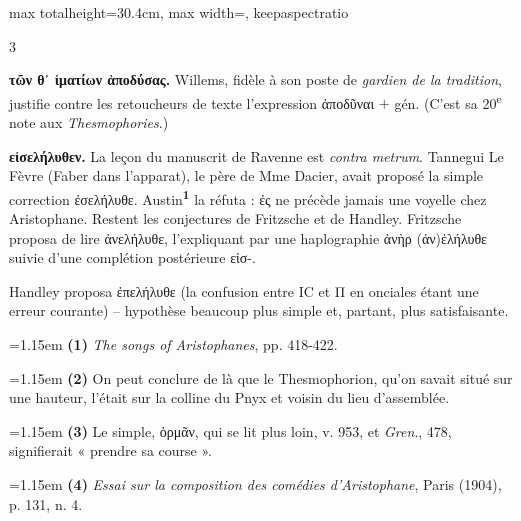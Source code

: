 \documentclass[11pt,twoside]{book}
\newcommand{\italique}[1]{\textit{#1}}
\newcommand{\nieme}[1]{#1\textsuperscript{e}}
\newcommand{\marqueur}[1]{\textsuperscript{\color{rubricRed}\textbf{#1}}}
\begin{document}
\begin{adjustbox}{max totalheight=30.4cm, max width=\textwidth, keepaspectratio}
\begin{minipage}{\textwidth}
{\begin{multicols}{3}
\par\vspace{1.5pt}
 \textbf{τῶν θ᾽ ἱματίων ἀποδύσας.} Willems, fidèle à son poste de \italique{gardien de la tradition}, justifie contre les retoucheurs de texte l'expression ἀποδῦναι $+$ gén. (C'est sa \nieme{20} note aux \italique{Thesmophories}.)
\par\vspace{1.5pt}
 \textbf{εἰσελήλυθεν.} La leçon du manuscrit de Ravenne est \italique{contra metrum}. Tannegui Le Fèvre (Faber dans l'apparat), le père de Mme Dacier, avait proposé la simple correction ἐσελήλυθε. Austin\marqueur{1} la réfuta : ἐς ne précède jamais une voyelle chez Aristophane. Restent les conjectures de Fritzsche et de Handley. Fritzsche proposa de lire ἀνελήλυθε, l'expliquant par une haplographie ἀνὴρ (ἀν)ἐλήλυθε suivie d'une complétion postérieure εἰσ-.
\par\vspace{1.5pt}
\noindent Handley proposa ἐπελήλυθε (la confusion entre ΙC et Π en onciales étant une erreur courante) -- hypothèse beaucoup plus simple et, partant, plus satisfaisante.
\par\vspace{1.5pt}
\par\vspace{1.2pt}\par\nopagebreak\vspace{1pt}\noindent\hangindent=1.15em {\color{sepiaNote}\textbf{(1)}} \italique{The songs of Aristophanes}, pp. 418-422.
\par\vspace{1.5pt}
\noindent\hangindent=1.15em {\color{sepiaNote}\textbf{(2)}} On peut conclure de là que le Thesmophorion, qu'on savait situé sur une hauteur, l'était sur la colline du Pnyx et voisin du lieu d'assemblée.
\par\vspace{1.5pt}
\noindent\hangindent=1.15em {\color{sepiaNote}\textbf{(3)}} Le simple, ὀρμᾶν, qui se lit plus loin, v. 953, et \italique{Gren}., 478, signifierait « prendre sa course ».
\par\vspace{1.5pt}
\noindent\hangindent=1.15em {\color{sepiaNote}\textbf{(4)}} \italique{Essai sur la composition des comédies d'Aristophane}, Paris (1904), p. 131, n. 4.

\end{multicols}}
\end{minipage}
\end{adjustbox}
\end{document}

